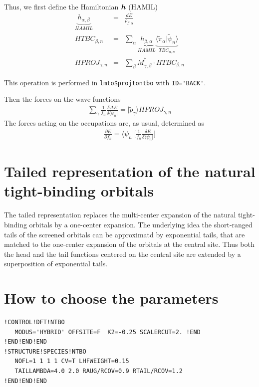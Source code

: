 \documentclass[11pt,a4paper]{report}
\begin{document}
Thus, we first define the Hamiltonian $\bm{h}$ (HAMIL) 
\begin{eqnarray}
\underbrace{h_{\alpha,\beta}}_{HAMIL}&=&\frac{dE}{\rho_{\beta,\alpha}}
\nonumber\\
HTBC_{\beta,n}&=&
\sum_\alpha \underbrace{h_{\beta,\alpha}}_{HAMIL}
\underbrace{\langle\tilde{\pi}_\alpha|\tilde{\psi}_n\rangle}_{TBC_{\alpha,n}}
\nonumber\\
HPROJ_{\gamma,n}&=&\sum_\beta M^\dagger_{\gamma,\beta}\cdot HTBC_{\beta,n}
\end{eqnarray}

This operation is performed in
\verb|lmto$projtontbo| with \verb|ID='BACK'|.


Then the forces on the wave functions 
\begin{eqnarray}
\sum_{\gamma}
\frac{1}{f_n}\frac{\delta \Delta E}{\delta\langle\psi_n|}
=|\tilde{p}_\gamma\rangle HPROJ_{\gamma,n}
\end{eqnarray}
The forces acting on the occupations are, as usual, determined as
\begin{eqnarray}
\frac{\partial E}{\partial f_n}=\langle\psi_n|
\biggl[
\frac{1}{f_n}\frac{\delta E}{\delta\langle\psi_n|}
\biggr]
\end{eqnarray}

\section{Tailed representation of the natural tight-binding orbitals}
The tailed representation replaces the multi-center expansion of the
natural tight-binding orbitals by a one-center expansion. The
underlying idea the short-ranged tails of the screened orbitals can be
approximatd by exponential tails, that are matched to the one-center
expansion of the orbitals at the central site. Thus both the head and
the tail functions centered on the central site are extended by a
superposition of exponential tails.

\section{How to choose the parameters}
\begin{verbatim}
!CONTROL!DFT!NTBO 
   MODUS='HYBRID' OFFSITE=F  K2=-0.25 SCALERCUT=2. !END
!END!END!END
!STRUCTURE!SPECIES!NTBO    
   NOFL=1 1 1 1 CV=T LHFWEIGHT=0.15
   TAILLAMBDA=4.0 2.0 RAUG/RCOV=0.9 RTAIL/RCOV=1.2
!END!END!END
\end{verbatim}
\end{document}
